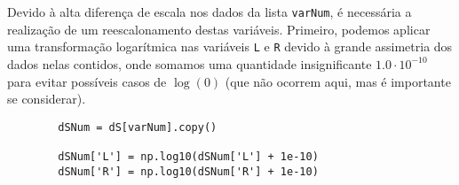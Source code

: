 Devido à alta diferença de escala nos dados da lista \verb|varNum|, é necessária a realização de um reescalonamento destas variáveis. Primeiro, podemos aplicar uma transformação logarítmica nas variáveis \verb|L| e \verb|R| devido à grande assimetria dos dados nelas contidos, onde somamos uma quantidade insignificante $1.0 \cdot 10^{-10}$ para evitar possíveis casos de $\log(0)$ (que não ocorrem aqui, mas é importante se considerar).
\begin{longlisting}
    \begin{verbatim}
        dSNum = dS[varNum].copy()
        
        dSNum['L'] = np.log10(dSNum['L'] + 1e-10) 
        dSNum['R'] = np.log10(dSNum['R'] + 1e-10) 
    \end{verbatim}
\end{longlisting}

